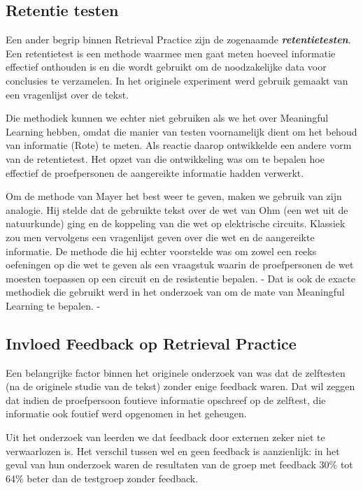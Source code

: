 \documentclass{hogent-article}
\newcommand{\boldit}[1]{\emph{\textbf{#1}}}
\begin{document}
\subsection{Retentie testen}
\label{RT}
Een ander begrip binnen Retrieval Practice zijn de zogenaamde \boldit{retentietesten}. Een retentietest is een methode waarmee men gaat meten hoeveel informatie effectief onthouden is en die wordt gebruikt om de noodzakelijke data voor conclusies te verzamelen. In het originele experiment \textcite{Roediger_2006} werd gebruik gemaakt van een vragenlijst over de tekst.\\

\par
\noindent
Die methodiek kunnen we echter niet gebruiken als we het over Meaningful Learning hebben, omdat die manier van testen voornamelijk dient om het behoud van informatie (Rote) te meten. Als reactie daarop ontwikkelde \textcite{Mayer_2002} een andere vorm van de retentietest. Het opzet van die ontwikkeling was om te bepalen hoe effectief de proefpersonen de aangereikte informatie hadden verwerkt.\\
\par
\noindent
Om de methode van Mayer het best weer te geven, maken we gebruik van zijn analogie. Hij stelde dat de gebruikte tekst over de wet van Ohm (een wet uit de natuurkunde) ging en de koppeling van die wet op elektrische circuits. Klassiek zou men vervolgens een vragenlijst geven over die wet en de aangereikte informatie. De methode die hij echter voorstelde was om zowel een reeks oefeningen op die wet te geven als een vraagstuk waarin de proefpersonen de wet moesten toepassen op een circuit en de resistentie bepalen. - Dat is ook de exacte methodiek die gebruikt werd in het onderzoek van \textcite{van_Gog_2012} om de mate van Meaningful Learning te bepalen. -

\subsection{Invloed Feedback op Retrieval Practice}

Een belangrijke factor binnen het originele onderzoek van \textcite{Roediger_2006} was dat de zelftesten (na de originele studie van de tekst) zonder enige feedback waren. Dat wil zeggen dat indien de proefpersoon foutieve informatie opschreef op de zelftest, die informatie ook foutief werd opgenomen in het geheugen.\\
\par
\noindent
Uit het onderzoek van \textcite{Roediger_2011} leerden we dat feedback door externen zeker niet te verwaarlozen is. Het verschil tussen wel en geen feedback is aanzienlijk: in het geval van hun onderzoek waren de resultaten van de groep met feedback 30\% tot 64\% beter dan de testgroep zonder feedback.
\end{document}

